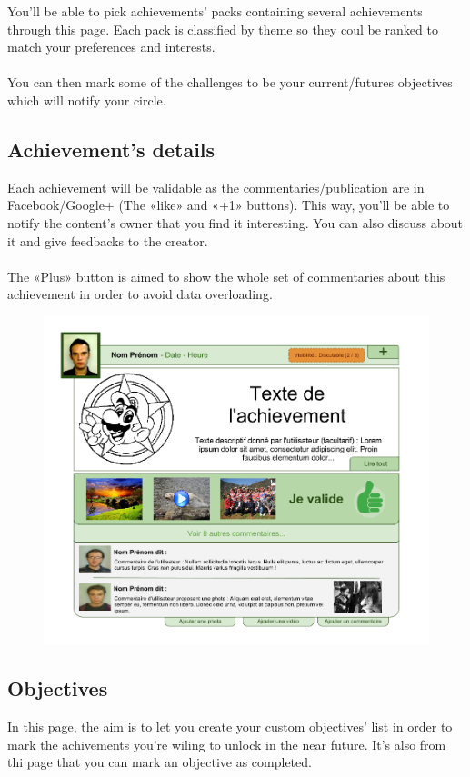 \documentclass{life-en}
\begin{document}
You'll be able to pick achievements' packs containing several achievements through this page. Each pack is classified by theme so they coul be ranked to match your preferences and interests.\\
\\
You can then mark some of the challenges to be your current/futures objectives which will notify your circle.

\subsection{Achievement's details}

Each achievement will be validable as the commentaries/publication are in Facebook/Google+ (The «like» and «+1» buttons). This way, you'll be able to notify the content's owner that you find it interesting. You can also discuss about it and give feedbacks to the creator.\\
\\
The «Plus» button is aimed to show the whole set of commentaries about this achievement in order to avoid data overloading.\\

\begin{figure}[H]
	\begin{center}
		\includegraphics[width=15cm]{img/achievement.png}
	\end{center}
\end{figure}

\subsection{Objectives}
In this page, the aim is to let you create your custom objectives' list in order to mark the achivements you're wiling to unlock in the near future. It's also from thi page that you can mark an objective as completed.\\
\end{document}
